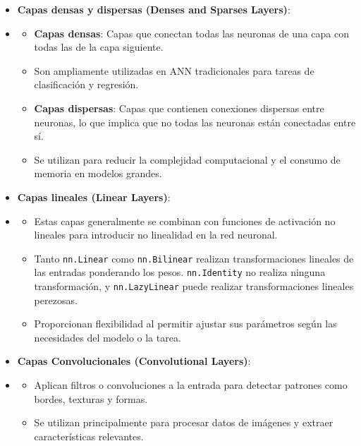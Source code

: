 \begin{itemize}
    \item \textbf{Capas densas y dispersas (Denses and Sparses Layers)}:
    \item[]
        \begin{itemize}
            \item \textbf{Capas densas}: Capas que conectan todas las neuronas de una capa con todas las de la capa siguiente.
            \item[] Son ampliamente utilizadas en \acrshort{ANN} tradicionales  para tareas de clasificación y regresión.
            \item \textbf{Capas dispersas}: Capas que contienen conexiones dispersas entre neuronas, lo que implica que no todas las neuronas están conectadas entre sí.
            \item[] Se utilizan para reducir la complejidad computacional y el consumo de memoria en modelos grandes.
        \end{itemize}
    \item \textbf{Capas lineales (Linear Layers)}:
    \item[]
        \begin{itemize}
            \item Estas capas generalmente se combinan con funciones de activación no lineales para introducir no linealidad en la red neuronal.
            \item Tanto \texttt{nn.Linear} como \texttt{nn.Bilinear} realizan transformaciones lineales de las entradas ponderando los pesos. \texttt{nn.Identity} no realiza ninguna transformación, y \texttt{nn.LazyLinear} puede realizar transformaciones lineales perezosas.
            \item Proporcionan flexibilidad al permitir ajustar sus parámetros según las necesidades del modelo o la tarea.
        \end{itemize}
    \item \textbf{Capas Convolucionales (Convolutional Layers)}:
    \item[]
        \begin{itemize}
            \item Aplican filtros o convoluciones a la entrada para detectar patrones como bordes, texturas y formas.
            \item Se utilizan principalmente para procesar datos de imágenes y extraer características relevantes.

\end{itemize}
\end{itemize}
